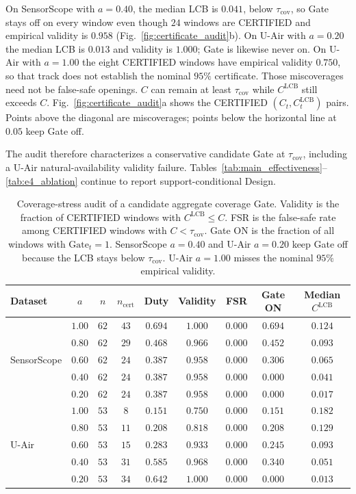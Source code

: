 \documentclass[letterpaper,journal]{IEEEtran}
\begin{document}
On SensorScope with $a=0.40$, the median LCB is $0.041$, below
$\tau_{\mathrm{cov}}$, so Gate stays off on every window even though
$24$ windows are CERTIFIED and empirical validity is $0.958$
(Fig.~\ref{fig:certificate_audit}b).  On U-Air with $a=0.20$ the median
LCB is $0.013$ and validity is $1.000$; Gate is likewise never on.
On U-Air with $a=1.00$ the eight CERTIFIED windows have empirical
validity $0.750$, so that track does not establish the nominal $95\%$
certificate.  Those miscoverages need not be false-safe openings.
$C$ can remain at least $\tau_{\mathrm{cov}}$ while
$C^{\mathrm{LCB}}$ still exceeds $C$.  Fig.~\ref{fig:certificate_audit}a shows the CERTIFIED
$(C_t,C^{\mathrm{LCB}}_t)$ pairs.  Points above the diagonal are
miscoverages; points below the horizontal line at $0.05$ keep Gate off.

The audit therefore characterizes a conservative candidate Gate at
$\tau_{\mathrm{cov}}$, including a U-Air natural-availability validity
failure.  Tables~\ref{tab:main_effectiveness}--\ref{tab:e4_ablation}
continue to report support-conditional Design.

\begin{table}[t]
\centering
\caption{Coverage-stress audit of a candidate aggregate coverage Gate.
Validity is the fraction of CERTIFIED windows with
$C^{\mathrm{LCB}}\le C$.  FSR is the false-safe rate among CERTIFIED
windows with $C<\tau_{\mathrm{cov}}$.  Gate ON is the fraction of all
windows with $\mathrm{Gate}_t=1$.  SensorScope $a=0.40$ and U-Air
$a=0.20$ keep Gate off because the LCB stays below $\tau_{\mathrm{cov}}$.
U-Air $a=1.00$ misses the nominal $95\%$ empirical validity.}
\label{tab:certificate_stress}
\scriptsize
\setlength{\tabcolsep}{3.2pt}
\begin{tabular}{lcccccccc}
\toprule
Dataset & $a$ & $n$ & $n_{\mathrm{cert}}$ & Duty & Validity & FSR & Gate ON & Median $C^{\mathrm{LCB}}$\\
\midrule
\multirow{5}{*}{SensorScope}
& $1.00$ & $62$ & $43$ & $0.694$ & $1.000$ & $0.000$ & $0.694$ & $0.124$\\
& $0.80$ & $62$ & $29$ & $0.468$ & $0.966$ & $0.000$ & $0.452$ & $0.093$\\
& $0.60$ & $62$ & $24$ & $0.387$ & $0.958$ & $0.000$ & $0.306$ & $0.065$\\
& $0.40$ & $62$ & $24$ & $0.387$ & $0.958$ & $0.000$ & $0.000$ & $0.041$\\
& $0.20$ & $62$ & $24$ & $0.387$ & $0.958$ & $0.000$ & $0.000$ & $0.017$\\
\midrule
\multirow{5}{*}{U-Air}
& $1.00$ & $53$ & $8$ & $0.151$ & $0.750$ & $0.000$ & $0.151$ & $0.182$\\
& $0.80$ & $53$ & $11$ & $0.208$ & $0.818$ & $0.000$ & $0.208$ & $0.129$\\
& $0.60$ & $53$ & $15$ & $0.283$ & $0.933$ & $0.000$ & $0.245$ & $0.093$\\
& $0.40$ & $53$ & $31$ & $0.585$ & $0.968$ & $0.000$ & $0.340$ & $0.051$\\
& $0.20$ & $53$ & $34$ & $0.642$ & $1.000$ & $0.000$ & $0.000$ & $0.013$\\
\bottomrule
\end{tabular}
\end{table}
\end{document}
